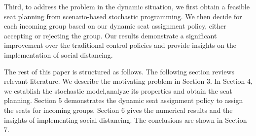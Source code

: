 Third, to address the problem in the dynamic situation, we first obtain a feasible seat planning from scenario-based stochastic programming. We then decide for each incoming group based on our dynamic seat assignment policy, either accepting or rejecting the group. Our results demonstrate a significant improvement over the traditional control policies and provide insights on the implementation of social distancing.


The rest of this paper is structured as follows. The following section reviews relevant literature. We describe the motivating problem in Section 3. In Section 4, we establish the stochastic model,analyze its properties and obtain the seat planning. Section 5 demonstrates the dynamic seat assignment policy to assign the seats for incoming groups. Section 6 gives the numerical results and the insights of implementing social distancing. The conclusions are shown in Section 7.
\newpage
